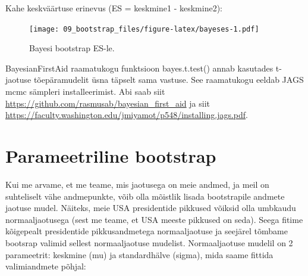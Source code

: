 \documentclass[]{book}
\newenvironment{Shaded}{\begin{snugshade}}{\end{snugshade}}
\newcommand{\CommentTok}[1]{\textcolor[rgb]{0.56,0.35,0.01}{\textit{#1}}}
\newcommand{\DataTypeTok}[1]{\textcolor[rgb]{0.13,0.29,0.53}{#1}}
\newcommand{\DecValTok}[1]{\textcolor[rgb]{0.00,0.00,0.81}{#1}}
\newcommand{\KeywordTok}[1]{\textcolor[rgb]{0.13,0.29,0.53}{\textbf{#1}}}
\newcommand{\NormalTok}[1]{#1}
\newcommand{\OperatorTok}[1]{\textcolor[rgb]{0.81,0.36,0.00}{\textbf{#1}}}
\newcommand{\OtherTok}[1]{\textcolor[rgb]{0.56,0.35,0.01}{#1}}
\newcommand{\StringTok}[1]{\textcolor[rgb]{0.31,0.60,0.02}{#1}}
\begin{document}
Kahe keskväärtuse erinevus (ES = keskmine1 - keskmine2):



\begin{Shaded}
\end{Shaded}

\begin{figure}
\centering
\texttt{[image: 09\_bootstrap\_files/figure-latex/bayeses-1.pdf]}
\caption{\label{fig:bayeses}Bayesi bootstrap ES-le.}
\end{figure}

BayesianFirstAid raamatukogu funktsioon bayes.t.test() annab kasutades t-jaotuse tõepäramudelit üsna täpselt sama vastuse.
See raamatukogu eeldab JAGS mcmc sämpleri installeerimist.
Abi saab siit \url{https://github.com/rasmusab/bayesian_first_aid} ja siit \url{https://faculty.washington.edu/jmiyamot/p548/installing.jags.pdf}.

\hypertarget{parameetriline-bootstrap}{%
\section*{Parameetriline bootstrap}\label{parameetriline-bootstrap}}

Kui me arvame, et me teame, mis jaotusega on meie andmed, ja meil on suhteliselt vähe andmepunkte, võib olla mõistlik lisada bootstrapile andmete jaotuse mudel. Näiteks, meie USA presidentide pikkused võiksid olla umbkaudu normaaljaotusega (sest me teame, et USA meeste pikkused on seda). Seega fitime kõigepealt presidentide pikkusandmetega normaaljaotuse ja seejärel tõmbame bootsrap valimid sellest normaaljaotuse mudelist.
Normaaljaotuse mudelil on 2 parameetrit: keskmine (mu) ja standardhälve (sigma), mida saame fittida valimiandmete põhjal:
\end{document}
